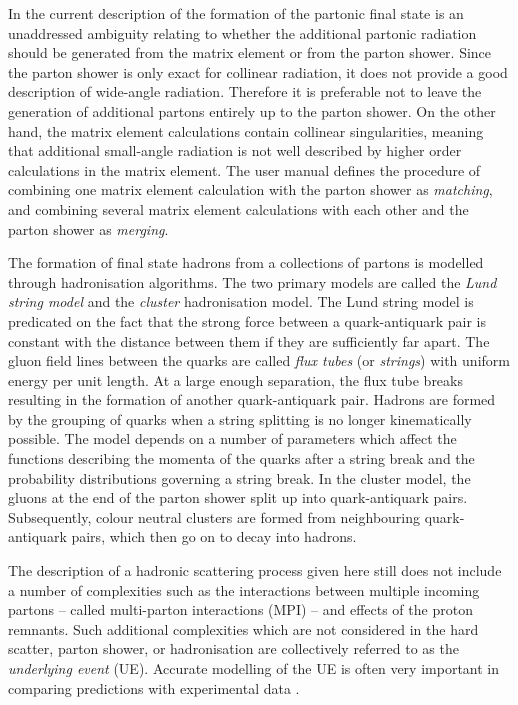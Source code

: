 In the current description of the formation of the partonic final state is an unaddressed ambiguity relating to whether the additional partonic radiation should be generated from the matrix element or from the parton shower. Since the parton shower is only exact for collinear radiation, it does not provide a good description of wide-angle radiation. Therefore it is preferable not to leave the generation of additional partons entirely up to the parton shower. On the other hand, the matrix element calculations contain collinear singularities, meaning that additional small-angle radiation is not well described by higher order calculations in the matrix element. The \PYTHIA user manual \cite{Theory:Pythiamanual} defines the procedure of combining one matrix element calculation with the parton shower as \textit{matching}, and combining several matrix element calculations with each other and the parton shower as \textit{merging}.

The formation of final state hadrons from a collections of partons is modelled through hadronisation algorithms. The two primary models are called the \textit{Lund string model} and the \textit{cluster} hadronisation model. The Lund string model is predicated on the fact that the strong force between a quark-antiquark pair is constant with the distance between them if they are sufficiently far apart. The gluon field lines between the quarks are called \textit{flux tubes} (or \textit{strings}) with uniform energy per unit length. At a large enough separation, the flux tube breaks resulting in the formation of another quark-antiquark pair. Hadrons are formed by the grouping of quarks when a string splitting is no longer kinematically possible. The model depends on a number of parameters which affect the functions describing the momenta of the quarks after a string break and the probability distributions governing a string break. In the cluster model, the gluons at the end of the parton shower split up into quark-antiquark pairs. Subsequently, colour neutral clusters are formed from neighbouring quark-antiquark pairs, which then go on to decay into hadrons. 

The description of a hadronic scattering process given here still does not include a number of complexities such as the interactions between multiple incoming partons -- called multi-parton interactions (MPI) -- and effects of the proton remnants. Such additional complexities which are not considered in the hard scatter, parton shower, or hadronisation are collectively referred to as the \textit{underlying event} (UE). Accurate modelling of the UE is often very important in comparing predictions with experimental data \cite{Buckley:evgens}. %

